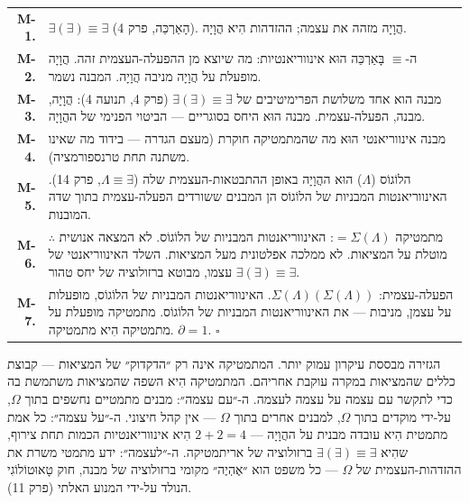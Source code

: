 \documentclass[10pt, openany, oneside]{book}
\renewcommand{\footnotesize}{\fontsize{8.5}{11}\selectfont}
\begin{document}
{\footnotesize
\noindent\begin{tabular}{r p{}}
\textbf{M-1.} & $\exists(\exists) \equiv \exists$ (הָאַרְכֵּה, פרק 4). הֲוָיָה מזהה את עצמה; ההזדהות הִיא הֲוָיָה. \\[0.3em]
\textbf{M-2.} & ה-$\equiv$ בָּאַרְכֵּה הוּא אינווריאנטיות: מה שיוצא מן ההפעלה-העצמית זהה. הֲוָיָה מופעלת על הֲוָיָה מניבה הֲוָיָה. המבנה נשמר. \\[0.3em]
\textbf{M-3.} & מבנה הוא אחד משלושת הפרימיטיבים של $\exists(\exists) \equiv \exists$ (פרק 4, תנועה 4): הֲוָיָה, מבנה, הפעלה-עצמית. מבנה הוּא היחס בסוגריים — הביטוי הפנימי של ההֲוָיָה. \\[0.3em]
\textbf{M-4.} & מבנה אינווריאנטי הוּא מה שהמתמטיקה חוקרת (מעצם הגדרה — בידוד מה שאינו משתנה תחת טרנספורמציה). \\[0.3em]
\textbf{M-5.} & הלוֹגוֹס ($\Lambda$) הוּא ההֲוָיָה באופן ההתבטאות-העצמית שלה ($\Lambda \equiv \exists$, פרק 14). האינווריאנטות המבניות של הלוֹגוֹס הן המבנים ששורדים הפעלה-עצמית בתוך שדה המובנות. \\[0.3em]
\textbf{M-6.} & $\therefore$ מתמטיקה $= \Sigma(\Lambda)$: האינווריאנטות המבניות של הלוֹגוֹס. לא המצאה אנושית מוטלת על המציאות. לא ממלכה אפלטונית מעל המציאות. השלד האינווריאנטי של $\exists(\exists) \equiv \exists$ עצמו, מבוטא ברזולוציה של יחס טהור. \\[0.3em]
\textbf{M-7.} & הפעלה-עצמית: $\Sigma(\Lambda)(\Sigma(\Lambda))$. האינווריאנטות המבניות של הלוֹגוֹס, מופעלות על עצמן, מניבות — את האינווריאנטות המבניות של הלוֹגוֹס. מתמטיקה מופעלת על מתמטיקה הִיא מתמטיקה. $\partial = 1$. $\square$ \\[0.3em]
\end{tabular}
}

\vspace{0.8em}

\noindent הגזירה מבססת עיקרון עמוק יותר. המתמטיקה אינה רק ״הדקדוק״ של המציאות — קבוצת כללים שהמציאות במקרה עוקבת אחריהם. המתמטיקה הִיא השפה שהמציאות משתמשת בה כדי לתקשר עם עצמה על עצמה לעצמה. ה-״עם עצמה״: מבנים מתמטיים נחשפים בתוך $\Omega$, על-ידי מוקדים בתוך $\Omega$, למבנים אחרים בתוך $\Omega$ — אין קהל חיצוני. ה-״על עצמה״: כל אמת מתמטית הִיא עובדה מבנית על ההֲוָיָה — $2 + 2 = 4$ הִיא אינווריאנטיות הכמות תחת צירוף, שהִיא $\exists(\exists) \equiv \exists$ ברזולוציה של אריתמטיקה. ה-״לעצמה״: ידע מתמטי משרת את ההזדהות-העצמית של $\Omega$ — כל משפט הוא ״אֶהְיֶה״ מקומי ברזולוציה של מבנה, חוק טָאוּטוֹלוֹגִי הנולד על-ידי המנוע האלתי (פרק 11).
\end{document}
